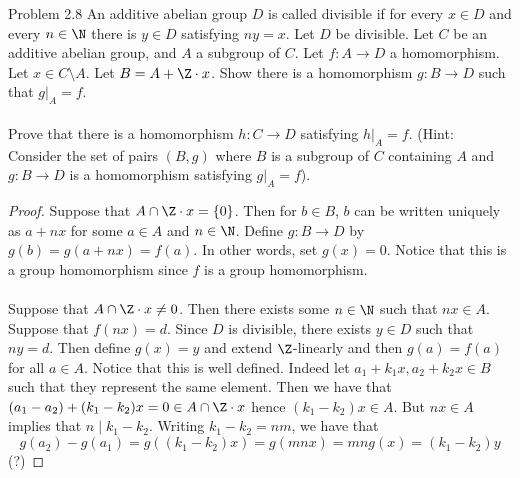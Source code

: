 \documentclass[a4paper]{article}
\begin{document}
\begin{ex}{Problem 2.8}{} An additive abelian group $D$ is called divisible if for every $x\in D$ and every $n\in\N$ there is $y\in D$ satisfying $ny=x$. Let $D$ be divisible. Let $C$ be an additive abelian group, and $A$ a subgroup of $C$. Let $f:A\to D$ a homomorphism. Let $x\in C\setminus A$. Let $B=A+\Z\cdot x$. Show there is a homomorphism $g:B\to D$ such that $g|_A=f$. \\~\\

Prove that there is a homomorphism $h:C\to D$ satisfying $h|_A=f$. (Hint: Consider
the set of pairs $(B,g)$ where $B$ is a subgroup of $C$ containing $A$ and $g:B\to D$ is a
homomorphism satisfying $g|_A=f$). \tcbline
\begin{proof}
Suppose that $A\cap\Z\cdot x=\{0\}$. Then for $b\in B$, $b$ can be written uniquely as $a+nx$ for some $a\in A$ and $n\in\N$. Define $g:B\to D$ by $g(b)=g(a+nx)=f(a)$. In other words, set $g(x)=0$. Notice that this is a group homomorphism since $f$ is a group homomorphism. \\~\\

Suppose that $A\cap\Z\cdot x\neq 0$. Then there exists some $n\in\N$ such that $nx\in A$. Suppose that $f(nx)=d$. Since $D$ is divisible, there exists $y\in D$ such that $ny=d$. Then define $g(x)=y$ and extend $\Z$-linearly and then $g(a)=f(a)$ for all $a\in A$. Notice that this is well defined. Indeed let $a_1+k_1x,a_2+k_2x\in B$ such that they represent the same element. Then we have that $(a_1-a_2)+(k_1-k_2)x=0\in A\cap\Z\cdot x$ hence $(k_1-k_2)x\in A$. But $nx\in A$ implies that $n\;|\;k_1-k_2$. Writing $k_1-k_2=nm$, we have that $$g(a_2)-g(a_1)=g((k_1-k_2)x)=g(mnx)=mng(x)=(k_1-k_2)y$$ (?)
\end{proof}
\end{ex}
\end{document}
